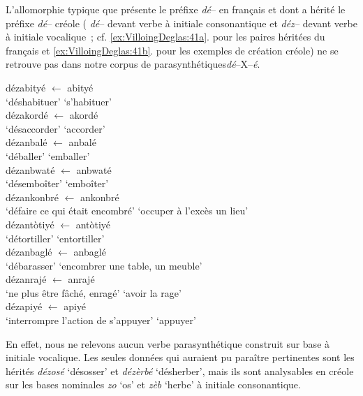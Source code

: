 \documentclass[output=paper]{langsci/langscibook}
\begin{document}
L'allomorphie typique que présente le préfixe \emph{dé}-- en français et
dont a hérité le préfixe \emph{dé}-- créole ( \emph{dé}-- devant verbe à
initiale consonantique et \emph{déz--} devant verbe à initiale
vocalique~; cf. \ref{ex:VilloingDeglas:41a}. pour les paires héritées du français et \ref{ex:VilloingDeglas:41b}. pour
les exemples de création créole) ne se retrouve pas dans notre corpus de
parasynthétiques\emph{dé}--X--\emph{é}.

  \ea \label{ex:VilloingDeglas:41}
        \ea\label{ex:VilloingDeglas:41a}
          \ea \gll dézabityé $\leftarrow$ abityé\\
            {`déshabituer'} {} {`s'habituer'}\\
          \ex \gll  dézakordé $\leftarrow$ akordé\\
            {`désaccorder'} {} {`accorder'}\\
          \ex \gll  dézanbalé $\leftarrow$ anbalé\\
            {`déballer'} {} {`emballer'}\\
          \ex \gll  dézanbwaté $\leftarrow$ anbwaté\\
            {`désemboîter'} {} {`emboîter'}\\
            \ex \gll  dézankonbré $\leftarrow$ ankonbré \\
              {`défaire ce qui était encombré'} {} {`occuper à l'excès un lieu'}\\
          \z
        \ex\label{ex:VilloingDeglas:41b}
            \ea \gll dézantòtiyé $\leftarrow$ antòtiyé\\
              {`détortiller'} {} {`entortiller'}\\
            \ex \gll  dézanbaglé $\leftarrow$ anbaglé\\
              {`débarasser'} {} {`encombrer une table, un meuble'}\\
            \ex \gll  dézanrajé $\leftarrow$ anrajé\\
              {`ne plus être fâché, enragé'} {} {`avoir la rage'}\\
            \ex \gll  dézapiyé $\leftarrow$ apiyé\\
              {`interrompre l'action de s'appuyer'} {} {`appuyer'}\\
            \z
  \z\z


En effet, nous ne relevons aucun verbe parasynthétique construit sur
base à initiale vocalique. Les seules données qui auraient pu paraître
pertinentes sont les hérités \emph{dézosé} `désosser' et \emph{dézèrbé}
`désherber', mais ils sont analysables en créole sur les bases nominales
\emph{zo} `os' et \emph{zèb} `herbe' à initiale consonantique.
\end{document}
